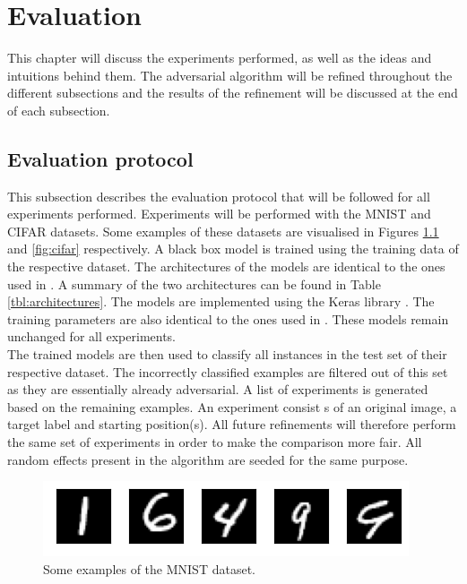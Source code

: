 \chapter{Evaluation}
This chapter will discuss the experiments performed, as well as the ideas and intuitions behind them. The adversarial algorithm will be refined throughout the different subsections and the results of the refinement will be discussed at the end of each subsection.

\section{Evaluation protocol}
This subsection describes the evaluation protocol that will be followed for all experiments performed. Experiments will be performed with the MNIST \cite{mnist} and CIFAR \cite{cifar} datasets. Some examples of these datasets are visualised in Figures \ref{fig:mnist} and \ref{fig:cifar} respectively. A black box model is trained using the training data of the respective dataset. The architectures of the models are identical to the ones used in \cite{cw_attack, defensive_distillation}. A summary of the two architectures can be found in Table \ref{tbl:architectures}. The models are implemented using the Keras library \cite{keras}. The training parameters are also identical to the ones used in \cite{cw_attack, defensive_distillation}. These models remain unchanged for all experiments.\\

The trained models are then used to classify all instances in the test set of their respective dataset. The incorrectly classified examples are filtered out of this set as they are essentially already adversarial. A list of experiments is generated based on the remaining examples. An experiment consist s of an original image, a target label and starting position(s). All future refinements will therefore perform the same set of experiments in order to make the comparison more fair. All random effects present in the algorithm are seeded for the same purpose.\\

\begin{figure}
\centering
\includegraphics[width=\textwidth]{Images/mnist.png}
\caption[Some examples of the MNIST dataset]{Some examples of the MNIST \cite{mnist} dataset.}
\label{fig:mnist}
\end{figure}

